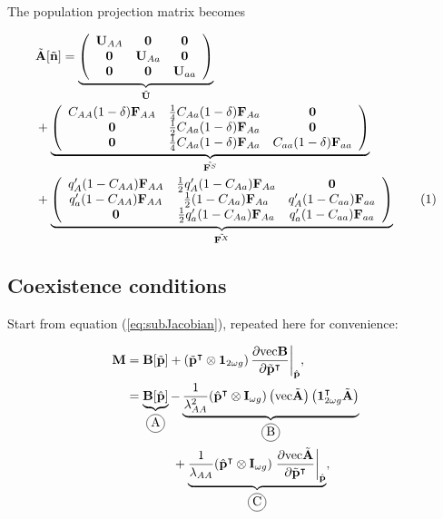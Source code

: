 \documentclass[11pt]{article}
\newcommand\encircle[1]{%
  \tikz[baseline=(X.base)] 
    \node (X) [draw, shape=circle, inner sep=0] {\strut #1};}
\newcommand\numberthis{\addtocounter{equation}{1}\tag{\theequation}}
\def\mbf#1{\mathbf{#1}}
\begin{document}
The population projection matrix becomes

\begin{align*}
	&\tilde{\mbf{A}}[\tilde{\mbf{n}}] = 
		 \underbrace{\left(
			\begin{array}{ccc}
				\mathbf{U}_{AA} & \mbf{0} & \mbf{0}\\ 
				\mbf{0} & \mathbf{U}_{Aa} & \mbf{0} \\
				\mbf{0} & \mbf{0} & \mathbf{U}_{aa} 
			\end{array} \right)}_{\tilde{\mbf{U}}}  \\ 
	&+\underbrace{\left(
			\begin{array}{ccc}
				C_{AA} (1 - \delta) \mbf{F}_{AA} & \frac{1}{4} C_{Aa} (1 - \delta) \mbf{F}_{Aa} & \mbf{0} \\ 
				\mbf{0} & \frac{1}{2} C_{Aa} (1 - \delta) \mbf{F}_{Aa} & \mbf{0} \\
				\mbf{0} & \frac{1}{4} C_{Aa} (1 - \delta) \mbf{F}_{Aa} & C_{aa} (1 - \delta) \mbf{F}_{aa} 
			\end{array} \right)}_{\tilde{\mbf{F}^S}} \\
			&+\underbrace{\left(
			\begin{array}{ccc}
				q^{\prime}_{A} (1 - C_{AA})\mbf{F}_{AA} & \frac{1}{2} q^{\prime}_{A} (1 - C_{Aa})\mbf{F}_{Aa}  & \mbf{0} \\
				q^{\prime}_{a} (1 - C_{AA}) \mbf{F}_{AA} & \frac{1}{2} (1 - C_{Aa})\mbf{F}_{Aa}  & q^{\prime}_{A} (1 - C_{aa})\mbf{F}_{aa}   \\
				\mbf{0} & \frac{1}{2} q^{\prime}_{a} (1 - C_{Aa})\mbf{F}_{Aa} & q^{\prime}_{a} (1 - C_{aa}) \mbf{F}_{aa} 
			\end{array} \right)}_{\tilde{\mbf{F}^X}} \numberthis
\end{align*}


\subsection*{Coexistence conditions}

\noindent Start from equation (\ref{eq:subJacobian}), repeated here for convenience:

\begin{align*} \label{eq:subJacobian_simplified}
	\mbf{M} &=  \mbf{B}[\tilde{\mbf{p}}] + \left( \tilde{\mbf{p}}^{\intercal} \otimes \mbf{1}_{2 \omega g} \right) \frac{ \partial \text{vec}{\mbf{B}} }{ \partial \tilde{\mbf{p}}^{\intercal} } \bigg\rvert_{\hat{\mbf{p}}}, \\
			&= \underbrace{ \mbf{B}[\hat{\mbf{p}}]}_{\encircle{A}} - 
			   \underbrace{ \frac{ 1 }{\lambda_{AA}^2 } (\hat{\mbf{p}}^{\intercal} \otimes \mbf{I}_{\omega g}) \left( \text{vec} \tilde{\mbf{A}} \right) \left( \mbf{1}^{\intercal}_{2 \omega g} \tilde{\mbf{A}} \right)}_{\encircle{B}} \\
			&~~~~~~~~~~~+ \underbrace{\frac{ 1 }{\lambda_{AA} } (\hat{\mbf{p}}^{\intercal} \otimes \mbf{I}_{\omega g}) \left. \frac{\partial \text{vec} \tilde{\mbf{A}}}{\partial \tilde{\mbf{p}}^{\intercal}} \right|_{\hat{\mbf{p}}}}_{\encircle{C}},
\end{align*}
\end{document}
